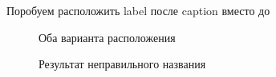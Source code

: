 \documentclass[
  english,
  russian,
  12pt,
  a4paper,
  DIV=11,
  numbers=noendperiod]{scrreprt}
\begin{document}
Поробуем расположить label после caption вместо до

\begin{figure}


\caption{\label{fig-031}Оба варианта расположения}

\end{figure}%

\begin{figure}


\caption{\label{fig-032}Результат неправильного названия}

\end{figure}%
\end{document}
